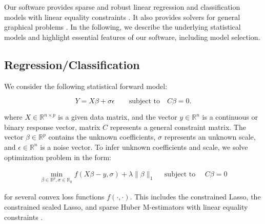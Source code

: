 \documentclass[10pt,a4paper]{article}
\let\cite\citep
\begin{document}

Our software provides sparse and robust linear regression and classification models with linear equality constraints \cite{Simpson2021}. It also provides solvers for general graphical problems \cite{Schaipp2021}. In the following, we describe the underlying statistical models and highlight essential features of our software, including model selection.

\subsection*{Regression/Classification}



We consider the following statistical forward model:

\begin{equation}
    Y = X\beta + \sigma \epsilon \qquad \textrm{subject to} \quad C \beta = 0.
\end{equation}

where $X \in \mathbb{R}^{n \times p}$ is a given data matrix, and the vector $y \in \mathbb{R}^n$ is a continuous or binary response vector, matrix $C$ represents a general constraint matrix. The vector $\beta \in \mathbb{R}^p$ contains the unknown coefficients, $\sigma$ represents an unknown scale, and $\epsilon \in \mathbb{R}^n$ is a noise vector. To infer unknown coefficients and scale, we solve optimization problem in the form:

\begin{equation}
    \begin{aligned}\label{eq:r1}
     \min _{\beta \in \mathbb{R}^p, \sigma \in \mathbb{R}_0} f(X \beta-y, \sigma)+\lambda\|\beta\|_1 \quad \text { subject to } \quad C \beta=0
    \end{aligned}
\end{equation}

for several convex loss functions $f(\cdot, \cdot)$. This includes the constrained Lasso, the constrained scaled Lasso, and sparse Huber M-estimators with linear equality constraints \cite{combettes2020perspective}.
\end{document}
